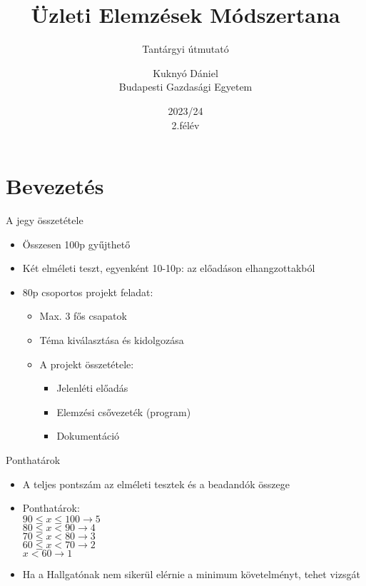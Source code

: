 \documentclass[english, aspectratio=169]{beamer}
\newcommand\makebeamertitle{\frame{\maketitle}}
\begin{document}
\section{Bevezetés}
\title[]{Üzleti Elemzések Módszertana}
\subtitle{Tantárgyi útmutató}
\author[Kuknyó Dániel]{Kuknyó Dániel\\Budapesti Gazdasági Egyetem}
\date{2023/24\\2.félév}
\makebeamertitle

\begin{frame}{A jegy összetétele}
\begin{itemize}
	\item Összesen 100p gyűjthető
	\item Két elméleti teszt, egyenként 10-10p: az előadáson elhangzottakból
	\item 80p csoportos projekt feladat:
	\begin{itemize}
		\item Max. 3 fős csapatok
		\item Téma kiválasztása és kidolgozása
		\item A projekt összetétele:
		\begin{itemize}
			\item Jelenléti előadás
			\item Elemzési csővezeték (program)
			\item Dokumentáció
		\end{itemize}
	\end{itemize}
\end{itemize}
\end{frame}

\begin{frame}{Ponthatárok}
\begin{itemize}
	\item A teljes pontszám az elméleti tesztek és a beadandók összege
	\item Ponthatárok:\\
	$90 \leq x \leq 100 \rightarrow 5$\\
	$80 \leq x < 90 \rightarrow 4$\\
	$70 \leq x < 80 \rightarrow 3$\\
	$60 \leq x < 70 \rightarrow 2$\\
	$x < 60 \rightarrow 1$
	\item Ha a Hallgatónak nem sikerül elérnie a minimum követelményt, tehet vizsgát
\end{itemize}
\end{frame}
\end{document}
